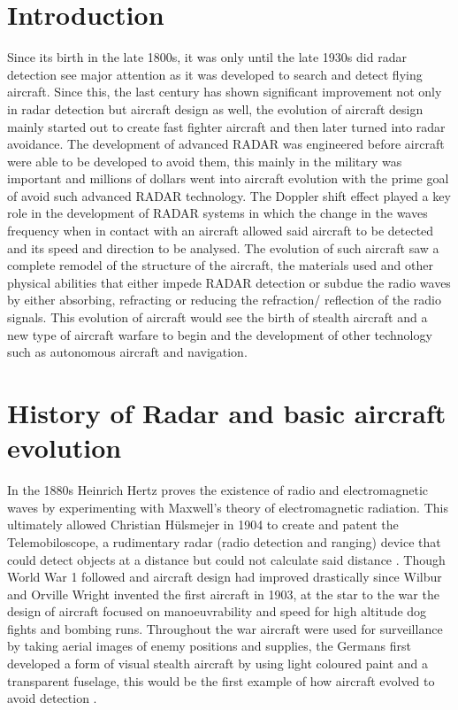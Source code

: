 \documentclass[12pt]{article}
\begin{document}
\section{Introduction}
\label{Introduction Section}

Since its birth in the late 1800s, it was only until the late 1930s did radar detection see major attention as it was developed to search and detect flying aircraft. Since this, the last century has shown significant improvement not only in radar detection but aircraft design as well, the evolution of aircraft design mainly started out to create fast fighter aircraft and then later turned into radar avoidance. The development of advanced RADAR was engineered before aircraft were able to be developed to avoid them, this mainly in the military was important and millions of dollars went into aircraft evolution with the prime goal of avoid such advanced RADAR technology. The Doppler shift effect played a key role in the development of RADAR systems in which the change in the waves frequency when in contact with an aircraft allowed said aircraft to be detected and its speed and direction to be analysed. The evolution of such aircraft saw a complete remodel of the structure of the aircraft, the materials used and other physical abilities that either impede RADAR detection or subdue the radio waves by either absorbing, refracting or reducing the refraction/ reflection of the radio signals. This evolution of aircraft would see the birth of stealth aircraft and a new type of aircraft warfare to begin and the development of other technology such as autonomous aircraft and navigation. \\

\section{History of Radar and basic aircraft evolution}
\label{History Section}

In the 1880s Heinrich Hertz proves the existence of radio and electromagnetic waves by experimenting with Maxwell's theory of electromagnetic radiation. This ultimately allowed Christian Hülsmejer in 1904 to create and patent the Telemobiloscope, a rudimentary radar (radio detection and ranging) device that could detect objects at a distance but could not calculate said distance \cite{Lecture1}. Though World War 1 followed and aircraft design had improved drastically since Wilbur and Orville Wright invented the first aircraft in 1903, at the star to the war the design of aircraft focused on manoeuvrability and speed for high altitude dog fights and bombing runs. Throughout the war aircraft were used for surveillance by taking aerial images of enemy positions and supplies, the Germans first developed a form of visual stealth aircraft by using light coloured paint and a transparent fuselage, this would be the first example of how aircraft evolved to avoid detection \cite{Ency}. \\
\end{document}
